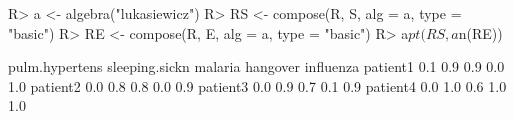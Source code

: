 \begin{Schunk}
% --begin: "comp.circ.excl"
\begin{Sinput}
R> a <- algebra("lukasiewicz")
R> RS <- compose(R, S, alg = a, type = "basic")
R> RE <- compose(R, E, alg = a, type = "basic")
R> a$pt(RS, a$n(RE))
\end{Sinput}
\begin{Soutput}
         pulm.hypertens sleeping.sickn malaria hangover influenza
patient1            0.1            0.9     0.9      0.0       1.0
patient2            0.0            0.8     0.8      0.0       0.9
patient3            0.0            0.9     0.7      0.1       0.9
patient4            0.0            1.0     0.6      1.0       1.0
\end{Soutput}
%
% --end: "comp.circ.excl"
\end{Schunk}
